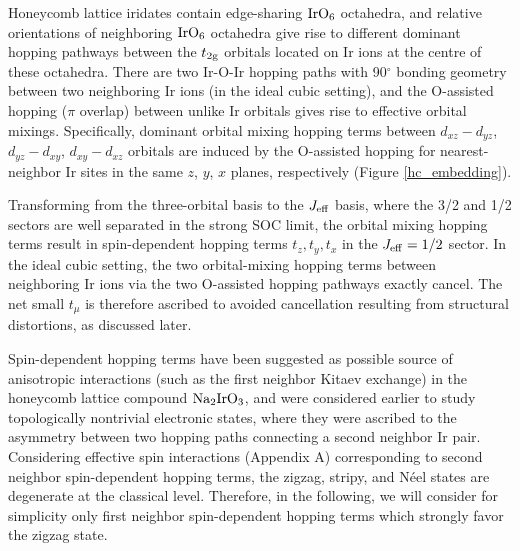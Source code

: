 \documentclass[aps,prb,fleqn,12pt,amsmath,amssymb]{revtex4}
\begin{document}
Honeycomb lattice iridates contain edge-sharing $\rm IrO_6$ octahedra, and relative orientations of neighboring $\rm IrO_6$ octahedra give rise to different dominant hopping pathways between the $t_{\rm 2g}$ orbitals located on Ir ions at the centre of these octahedra.\cite{jackeli_PRL_2009} There are two Ir-O-Ir hopping paths with 90$^\circ$ bonding geometry between two neighboring Ir ions (in the ideal cubic setting), and the O-assisted hopping ($\pi$ overlap) between unlike Ir orbitals gives rise to effective orbital mixings. Specifically, dominant orbital mixing hopping terms between $d_{xz}-d_{yz}$, $d_{yz}-d_{xy}$, $d_{xy}-d_{xz}$ orbitals are induced by the O-assisted hopping for nearest-neighbor Ir sites in the same $z$, $y$, $x$ planes, respectively (Figure \ref{hc_embedding}).

Transforming from the three-orbital basis to the $J_{\rm eff}$ basis, where the 3/2 and 1/2 sectors are well separated in the strong SOC limit, the orbital mixing hopping terms result in spin-dependent hopping terms $t_z, t_y, t_x$ in the $J_{\rm eff}=1/2$ sector.\cite{iridate_paper} In the ideal cubic setting, the two orbital-mixing hopping terms between neighboring Ir ions via the two O-assisted hopping pathways exactly cancel. The net small $t_\mu$ is therefore ascribed to avoided cancellation resulting from structural distortions, as discussed later.


Spin-dependent hopping terms have been suggested as possible source of anisotropic interactions (such as the first neighbor Kitaev exchange) in the honeycomb lattice compound $\rm Na_2IrO_3$,\cite{foyevtsova_PRB_2013} and were considered earlier to study topologically nontrivial electronic states,\cite{shitade_PRL_2009} where they were ascribed to the asymmetry between two hopping paths connecting a second neighbor Ir pair. Considering effective spin interactions (Appendix A) corresponding to second neighbor spin-dependent hopping terms, the zigzag, stripy, and N\'{e}el states are degenerate at the classical level. Therefore, in the following, we will consider for simplicity only first neighbor spin-dependent hopping terms which strongly favor the zigzag state. 
\end{document}
